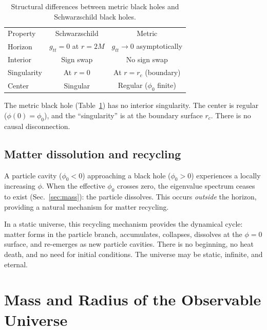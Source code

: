 \documentclass[aps,prd,twocolumn,superscriptaddress,nofootinbib,longbibliography]{revtex4-2}
\newcommand{\phiz}{\phi_0}
\begin{document}
\begin{table}[b]
\caption{\label{tab:bh}%
Structural differences between metric black holes and Schwarzschild
black holes.}
\begin{ruledtabular}
\begin{tabular}{lcc}
Property & Schwarzschild & Metric \\
\colrule
Horizon & $g_{tt} = 0$ at $r = 2M$ & $g_{tt} \to 0$ asymptotically \\
Interior & Sign swap & No sign swap \\
Singularity & At $r = 0$ & At $r = r_c$ (boundary) \\
Center & Singular & Regular ($\phi_0$ finite) \\
\end{tabular}
\end{ruledtabular}
\end{table}

The metric black hole (Table~\ref{tab:bh}) has no interior
singularity.  The center is regular ($\phi(0) = \phiz$), and the
``singularity'' is at the boundary surface $r_c$.  There is no
causal disconnection.

\subsection{Matter dissolution and recycling}

A particle cavity ($\phiz < 0$) approaching a black hole
($\phiz > 0$) experiences a locally increasing $\phi$.  When the
effective $\phiz$ crosses zero, the eigenvalue spectrum ceases to
exist (Sec.~\ref{sec:mass}): the particle dissolves.  This occurs
\emph{outside} the horizon, providing a natural mechanism for matter
recycling.

In a static universe, this recycling mechanism provides the dynamical
cycle: matter forms in the particle branch, accumulates, collapses,
dissolves at the $\phi = 0$ surface, and re-emerges as new particle
cavities.  There is no beginning, no heat death, and no need for
initial conditions.  The universe may be static, infinite, and
eternal.

\section{Mass and Radius of the Observable Universe}\label{sec:universe}
\end{document}

